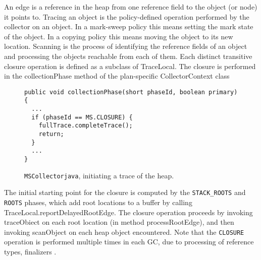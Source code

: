 An edge is a reference in the heap from one reference field to the object (or node) it points to.
Tracing an object is the policy-defined operation performed by the collector on an object.  In a mark-sweep policy this means setting the mark state of the object.  In a copying policy this means moving the object to its new location.
Scanning is the process of identifying the reference fields of an object and processing the objects reachable from each of them.
Each distinct transitive closure operation is defined as a subclass of TraceLocal.  
The closure is performed in the collectionPhase method of the plan-specific CollectorContext class
\begin{figure}[h]
\begin{lstlisting}
public void collectionPhase(short phaseId, boolean primary) {
  ...
  if (phaseId == MS.CLOSURE) {
    fullTrace.completeTrace();
    return;
  }
  ...
}
\end{lstlisting}
\caption{\lstinline|MSCollectorjava|, initiating a trace of the heap.}
\label{fig:gc:collect-closure}
\end{figure}
The initial starting point for the closure is computed by the
\lstinline|STACK_ROOTS| and \lstinline|ROOTS| phases, which add root locations
to a buffer by calling TraceLocal.reportDelayedRootEdge.  
The closure operation proceeds by invoking traceObiect on each root location 
(in method processRootEdge), and then invoking scanObject on each heap object encountered.  
Note that the \lstinline|CLOSURE| operation is performed multiple times in each
GC, due to processing of reference types, finalizers \etc.

